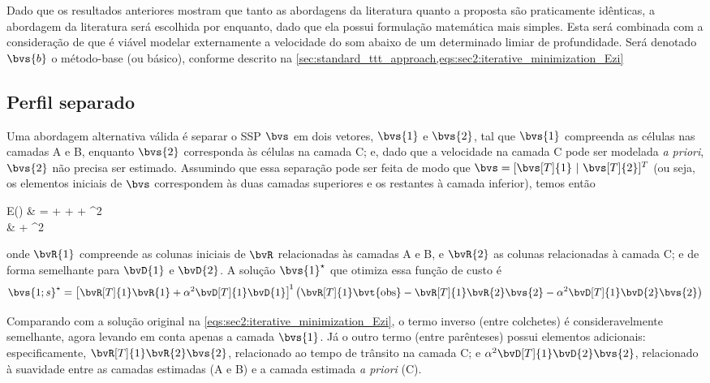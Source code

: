 Dado que os resultados anteriores mostram que tanto as abordagens da literatura quanto a proposta são praticamente idênticas, a abordagem da literatura será escolhida por enquanto, dado que ela possui formulação matemática mais simples. Esta será combinada com a consideração de que é viável modelar externamente a velocidade do som abaixo de um determinado limiar de profundidade. Será denotado $\bvs{b}$ o método-base (ou básico), conforme descrito na \cref{sec:standard_ttt_approach,eqs:sec2:iterative_minimization_Ezi}

\subsection{Perfil separado}

Uma abordagem alternativa válida é separar o SSP $\bvs$ em dois vetores, $\bvs{1}$ e $\bvs{2}$, tal que $\bvs{1}$ compreenda as células nas camadas A e B, enquanto $\bvs{2}$ corresponda às células na camada C; e, dado que a velocidade na camada C pode ser modelada \textit{a priori}, $\bvs{2}$ não precisa ser estimado. Assumindo que essa separação pode ser feita de modo que $\bvs = \tr{[\bvs[T]{1}~|~\bvs[T]{2}]}$ (ou seja, os elementos iniciais de $\bvs$ correspondem às duas camadas superiores e os restantes à camada inferior), temos então
\begin{equations}
	E()
	& =     +   +    + ^2 \\
	& + \alpha^2
\end{equations}
onde $\bvR{1}$ compreende as colunas iniciais de $\bvR$ relacionadas às camadas A e B, e $\bvR{2}$ as colunas relacionadas à camada C; e de forma semelhante para $\bvD{1}$ e $\bvD{2}$. A solução $\opt{\bvs{1}}$ que otimiza essa função de custo é
\begin{equation}
	\opt{\bvs{1;s}} = \inv*{\bvR[T]{1} \bvR{1} + \alpha^2 \bvD[T]{1} \bvD{1}} \pts{\bvR[T]{1}\bvt{\obs} - \bvR[T]{1}\bvR{2}\bvs{2} - \alpha^2 \bvD[T]{1} \bvD{2} \bvs{2}}
\end{equation}

Comparando com a solução original na \cref{eqs:sec2:iterative_minimization_Ezi}, o termo inverso (entre colchetes) é consideravelmente semelhante, agora levando em conta apenas a camada $\bvs{1}$. Já o outro termo (entre parênteses) possui elementos adicionais: especificamente, $\bvR[T]{1}\bvR{2}\bvs{2}$, relacionado ao tempo de trânsito na camada C; e $\alpha^2 \bvD[T]{1} \bvD{2} \bvs{2}$, relacionado à suavidade entre as camadas estimadas (A e B) e a camada estimada \textit{a priori} (C).

